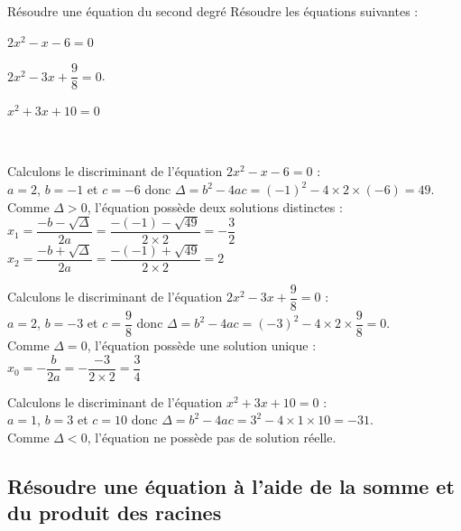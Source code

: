         
    \begin{bmethodet}{Résoudre une équation du second degré}
         Résoudre les équations suivantes : 
        \begin{enumMet}
            \item $2x^2-x-6=0$
            \item $2x^2-3x+\dfrac{9}{8}=0$.
            \item $x^2+3x+10=0$
        \end{enumMet}
        \\
        \begin{enumMet}
            \item Calculons le discriminant de l'équation $2x^2-x-6=0$ :\\
            $a = 2$, $b = -1$ et $c = -6$ donc $\Delta = b^2-4ac = (-1)^2 - 4 \times 2 \times (-6) = 49$.\\
            Comme $\Delta > 0$, l'équation possède deux solutions distinctes :\\
            \hspace*{2cm} $x_1= \dfrac{-b-\sqrt{\Delta}}{2a}=\dfrac{-(-1)-\sqrt{49}}{2\times2}=-\dfrac{3}{2}$\\
            \hspace*{2cm} $x_2= \dfrac{-b+\sqrt{\Delta}}{2a}=\dfrac{-(-1)+\sqrt{49}}{2\times2}=2$
            \item Calculons le discriminant de l'équation $2x^2-3x+\dfrac{9}{8}=0$ :\\
            $a = 2$, $b = -3$ et $c = \dfrac{9}{8}$ donc $\Delta = b^2-4ac = (-3)^2 - 4 \times 2 \times \dfrac{9}{8} = 0$.\\
            Comme $\Delta = 0$, l'équation possède une solution unique :\\
            \hspace*{2cm} $x_0= -\dfrac{b}{2a}=-\dfrac{-3}{2\times2}=\dfrac{3}{4}$\\
            \item Calculons le discriminant de l'équation $x^2+3x+10=0$ :\\
            $a = 1$, $b = 3$ et $c = 10$ donc $\Delta = b^2-4ac = 3^2 - 4 \times 1 \times 10 = -31$.\\
            Comme $\Delta < 0$, l'équation ne possède pas de solution réelle.
        \end{enumMet}
    \end{bmethodet}
    
\subsection{Résoudre une équation à l'aide de la somme et du produit des racines}
    
